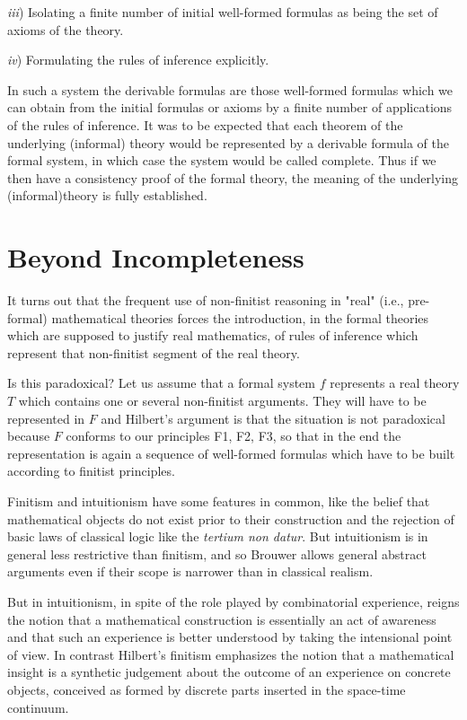 \documentclass[12pt]{article}
\begin{document}
\emph{iii}) Isolating a finite number of initial well-formed formulas as being the set of axioms of the theory.
 
\emph{iv}) Formulating the rules of inference explicitly.

In such a system the derivable formulas are those well-formed formulas which we can obtain from the initial formulas or axioms by a finite number of applications of the rules of inference. It was to be expected that each theorem of the underlying (informal) theory would be represented by a derivable formula of the formal system, in which case the system would be called complete. Thus if we then have a consistency proof of the formal theory, the meaning of the underlying (informal)theory is fully established.

\section{Beyond Incompleteness}\normalsize

It turns out that the frequent use of non-finitist reasoning in "real" (i.e., pre-formal) mathematical theories forces the introduction, in the formal theories which are supposed to justify real mathematics, of rules of inference which represent that non-finitist segment of the real theory.
 
Is this paradoxical? Let us assume that a formal system $f$ represents a real theory $T$ which contains one or several non-finitist  arguments. They will have to be represented in $F$ and Hilbert's argument is that the situation is not paradoxical because $F$ conforms to our  principles F1, F2, F3, so that in the end the representation is again a sequence of well-formed formulas which have to be built according to finitist principles.

Finitism and intuitionism have some features in common, like the belief that mathematical objects do not exist prior to their construction and the rejection of basic laws of classical logic like the \emph{tertium non datur}. But intuitionism is in general less restrictive than finitism, and so Brouwer allows general abstract arguments even if their scope is narrower than in classical realism.

But in intuitionism, in spite of the role played by combinatorial experience, reigns the notion that a mathematical construction is essentially an act of awareness and that such an experience is better understood by taking the  intensional point of view. In contrast Hilbert's finitism emphasizes the notion that a mathematical insight is a synthetic judgement about the outcome of an experience on concrete objects, conceived as formed by discrete parts inserted in the space-time continuum.
\end{document}
